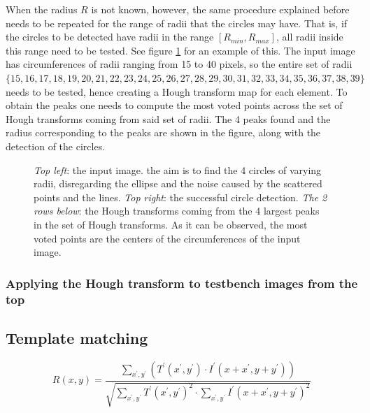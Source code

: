 \documentclass[../main.tex]{subfiles}
\begin{document}
When the radius $R$ is not known, however, the same procedure explained before needs to be repeated for the range of radii that the circles may have. That is, if the circles to be detected have radii in the range $[R_{min}, R_{max}]$, all radii inside this range need to be tested. See figure \ref{fig:hough_demo_all_circles} for an example of this. The input image has circumferences of radii ranging from 15 to 40 pixels, so the entire set of radii $\{15, 16, 17, 18, 19, 20, 21, 22, 23, 24, 25, 26, 27, 28, 29, 30, 31, 32, 33, 34, 35, 36, 37, 38, 39\}$ needs to be tested, hence creating a Hough transform map for each element. To obtain the peaks one needs to compute the most voted points across the set of Hough transforms coming from said set of radii. The 4 peaks found and the radius corresponding to the peaks are shown in the figure, along with the detection of the circles.

\begin{figure}[htbp]
    \centering
    \caption{\emph{Top left}: the input image. the aim is to find the 4 circles of varying radii, disregarding the ellipse and the noise caused by the scattered points and the lines. \emph{Top right}: the successful circle detection. \emph{The 2 rows below}: the Hough transforms coming from the 4 largest peaks in the set of Hough transforms. As it can be observed, the most voted points are the centers of the circumferences of the input image.}
    \label{fig:hough_demo_all_circles}
\end{figure}

\subsubsection{Applying the Hough transform to testbench images from the top}

\subsection{Template matching}

\begin{equation} \label{eq:TM_CCOEFF_NORMED}
    R(x, y)=\frac{\sum_{x^{\prime}, y^{\prime}}\left(T^{\prime}\left(x^{\prime}, y^{\prime}\right) \cdot I^{\prime}\left(x+x^{\prime}, y+y^{\prime}\right)\right)}{\sqrt{\sum_{x^{\prime}, y^{\prime}} T^{\prime}\left(x^{\prime}, y^{\prime}\right)^{2} \cdot \sum_{x^{\prime}, y^{\prime}} I^{\prime}\left(x+x^{\prime}, y+y^{\prime}\right)^{2}}}
\end{equation}
\end{document}
